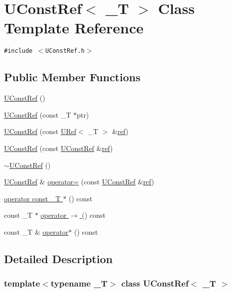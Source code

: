 \hypertarget{class_u_const_ref}{
\section{UConstRef$<$ \_\-T $>$ Class Template Reference}
\label{class_u_const_ref}
}
{\tt \#include $<$UConstRef.h$>$}

\subsection*{Public Member Functions}
\begin{CompactItemize}
\item 
\hyperlink{class_u_const_ref_eb44190a6765767081de3a3498fb828c}{UConstRef} ()
\item 
\hyperlink{class_u_const_ref_7d960398014c1b439f612b10aa600632}{UConstRef} (const \_\-T $\ast$ptr)
\item 
\hyperlink{class_u_const_ref_c0437dd725d2f83b6e52dde6e0e91d0a}{UConstRef} (const \hyperlink{class_u_ref}{URef}$<$ \_\-T $>$ \&\hyperlink{glext__bak_8h_083de4c8e32ad3d9059245f26be721de}{ref})
\item 
\hyperlink{class_u_const_ref_b90ff7a4fd8a4a5b74846c36b7c8fc85}{UConstRef} (const \hyperlink{class_u_const_ref}{UConstRef} \&\hyperlink{glext__bak_8h_083de4c8e32ad3d9059245f26be721de}{ref})
\item 
\hyperlink{class_u_const_ref_55fd512d23ddc51a39dbedbe9c5b5153}{$\sim$UConstRef} ()
\item 
\hyperlink{class_u_const_ref}{UConstRef} \& \hyperlink{class_u_const_ref_2fba377b5304cf356746771ecd97e95c}{operator=} (const \hyperlink{class_u_const_ref}{UConstRef} \&\hyperlink{glext__bak_8h_083de4c8e32ad3d9059245f26be721de}{ref})
\item 
\hyperlink{class_u_const_ref_5231901f5b5f4f9b5e626ec9277e57db}{operator const \_\-T $\ast$} () const 
\item 
const \_\-T $\ast$ \hyperlink{class_u_const_ref_435e93126a837aea7e947348bf76c53d}{operator $\rightarrow$ } () const 
\item 
const \_\-T \& \hyperlink{class_u_const_ref_9e338a1ebe7c20b4b30a60e4fcb7c134}{operator$\ast$} () const 
\end{CompactItemize}


\subsection{Detailed Description}
\subsubsection*{template$<$typename \_\-T$>$ class UConstRef$<$ \_\-T $>$}



